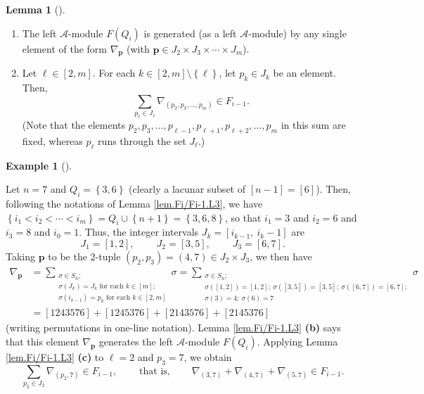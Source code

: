 \documentclass[numbers=enddot,12pt,final,onecolumn,notitlepage]{scrartcl}%
\theoremstyle{definition}
\newtheorem{lem}[theo]{Lemma}
\newenvironment{lemma}[1][]
{\begin{lem}[#1]\begin{leftbar}}
{\end{leftbar}\end{lem}}
\newtheorem{exam}[theo]{Example}
\newenvironment{example}[1][]
{\begin{exam}[#1]\begin{leftbar}}
{\end{leftbar}\end{exam}}
\let\sumnonlimits\sum
\renewcommand{\sum}{\sumnonlimits\limits}
\begin{document}
\begin{lemma}
\begin{enumerate}
\item[\textbf{(b)}] The left $\mathcal{A}$-module $F\left(  Q_{i}\right)  $ is
generated (as a left $\mathcal{A}$-module) by any single element of the form
$\nabla_{\mathbf{p}}$ (with $\mathbf{p}\in J_{2}\times J_{3}\times\cdots\times
J_{m}$).

\item[\textbf{(c)}] Let $\ell\in\left[  2,m\right]  $. For each $k\in\left[
2,m\right]  \setminus\left\{  \ell\right\}  $, let $p_{k}\in J_{k}$ be an
element. Then,%
\[
\sum_{p_{\ell}\in J_{\ell}}\nabla_{\left(  p_{2},p_{3},\ldots,p_{m}\right)
}\in F_{i-1}.
\]
(Note that the elements $p_{2},p_{3},\ldots,p_{\ell-1},p_{\ell+1},p_{\ell
+2},\ldots,p_{m}$ in this sum are fixed, whereas $p_{\ell}$ runs through the
set $J_{\ell}$.)
\end{enumerate}
\end{lemma}

\begin{example}
\label{exa.Fi/Fi-1.L3.e1}Let $n=7$ and $Q_{i}=\left\{  3,6\right\}  $ (clearly
a lacunar subset of $\left[  n-1\right]  =\left[  6\right]  $). Then,
following the notations of Lemma \ref{lem.Fi/Fi-1.L3}, we have $\left\{
i_{1}<i_{2}<\cdots<i_{m}\right\}  =Q_{i}\cup\left\{  n+1\right\}  =\left\{
3,6,8\right\}  $, so that $i_{1}=3$ and $i_{2}=6$ and $i_{3}=8$ and $i_{0}=1$.
Thus, the integer intervals $J_{k}=\left[  i_{k-1},\ i_{k}-1\right]  $ are
\[
J_{1}=\left[  1,2\right]  ,\ \ \ \ \ \ \ \ \ \ J_{2}=\left[  3,5\right]
,\ \ \ \ \ \ \ \ \ \ J_{3}=\left[  6,7\right]  .
\]
Taking $\mathbf{p}$ to be the $2$-tuple $\left(  p_{2},p_{3}\right)  =\left(
4,7\right)  \in J_{2}\times J_{3}$, we then have%
\begin{align*}
\nabla_{\mathbf{p}}  & =\sum_{\substack{\sigma\in S_{n};\\\sigma\left(
J_{k}\right)  =J_{k}\text{ for each }k\in\left[  m\right]  ;\\\sigma\left(
i_{k-1}\right)  =p_{k}\text{ for each }k\in\left[  2,m\right]  }}\sigma
=\sum_{\substack{\sigma\in S_{n};\\\sigma\left(  \left[  1,2\right]  \right)
=\left[  1,2\right]  ;\ \sigma\left(  \left[  3,5\right]  \right)  =\left[
3,5\right]  ;\ \sigma\left(  \left[  6,7\right]  \right)  =\left[  6,7\right]
;\\\sigma\left(  3\right)  =4;\ \sigma\left(  6\right)  =7}}\sigma\\
& =\left[  1243576\right]  +\left[  1245376\right]  +\left[  2143576\right]
+\left[  2145376\right]
\end{align*}
(writing permutations in one-line notation). Lemma \ref{lem.Fi/Fi-1.L3}
\textbf{(b)} says that this element $\nabla_{\mathbf{p}}$ generates the left
$\mathcal{A}$-module $F\left(  Q_{i}\right)  $. Applying Lemma
\ref{lem.Fi/Fi-1.L3} \textbf{(c)} to $\ell=2$ and $p_{3}=7$, we obtain%
\[
\sum_{p_{2}\in J_{2}}\nabla_{\left(  p_{2},7\right)  }\in F_{i-1}%
,\ \ \ \ \ \ \ \ \ \ \text{that is,}\ \ \ \ \ \ \ \ \ \ \nabla_{\left(
3,7\right)  }+\nabla_{\left(  4,7\right)  }+\nabla_{\left(  5,7\right)  }\in
F_{i-1}.
\]

\end{example}
\end{document}
